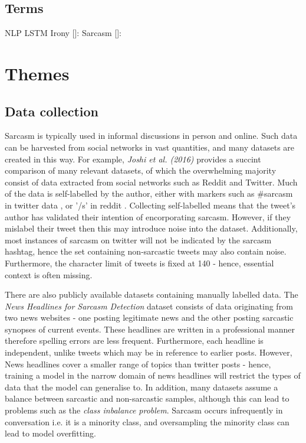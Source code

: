 \documentclass[12pt,a4paper]{article}
\begin{document}
\subsection{Terms}
NLP
LSTM
Irony []:
Sarcasm []:

\newpage

\section{Themes}
\subsection{Data collection}
\noindent Sarcasm is typically used in informal discussions in person and online. Such data can be harvested from social networks in vast quantities, and many datasets are created in this way. For example, \textit{Joshi et al. (2016)} \cite{joshi2016automatic} provides a succint comparison of many relevant datasets, of which the overwhelming majority consist of data extracted from social networks such as Reddit and Twitter. Much of the data is self-labelled by the author, either with markers such as \#sarcasm in twitter data \cite{reyes2013multidimensional, davidov2010semi, ptavcek2014sarcasm}, or '/s' in reddit \cite{khodak2017large}. Collecting self-labelled means that the tweet's author has validated their intention of encorporating sarcasm. However, if they mislabel their tweet then this may introduce noise into the dataset. Additionally, most instances of sarcasm on twitter will not be indicated by the sarcasm hashtag, hence the set containing non-sarcastic tweets may also contain noise. Furthermore, the character limit of tweets is fixed at 140 - hence, essential context is often missing.

There are also publicly available datasets containing manually labelled data. The \textit{News Headlines for Sarcasm Detection} dataset \cite{misra2019sarcasm} consists of data originating from two news websites - one posting legitimate news and the other posting sarcastic synopses of current events. These headlines are written in a professional manner therefore spelling errors are less frequent. Furthermore, each headline is independent, unlike tweets which may be in reference to earlier posts. However, News headlines cover a smaller range of topics than twitter posts - hence, training a model in the narrow domain of news headlines will restrict the types of data that the model can generalise to. In addition, many datasets assume a balance between sarcastic and non-sarcastic samples, although this can lead to problems such as the \textit{class inbalance problem}. Sarcasm occurs infrequently in conversation i.e. it is a minority class, and oversampling the minority class can lead to model overfitting.
\end{document}
